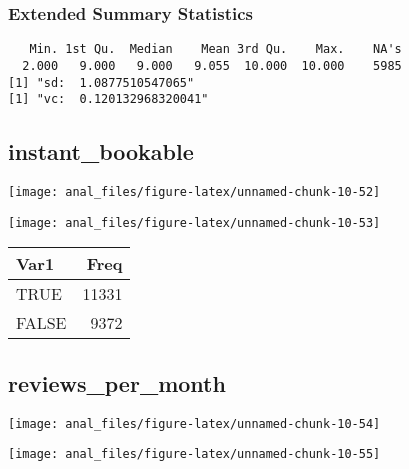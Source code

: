 \hypertarget{extended-summary-statistics-18}{%
\subsubsection{Extended Summary
Statistics}\label{extended-summary-statistics-18}}

\begin{verbatim}   Min. 1st Qu.  Median    Mean 3rd Qu.    Max.    NA's 
  2.000   9.000   9.000   9.055  10.000  10.000    5985 
[1] "sd:  1.0877510547065"
[1] "vc:  0.120132968320041"
\end{verbatim}

\pagebreak

\centering

\hypertarget{instant_bookable}{%
\subsection{instant\_bookable}\label{instant_bookable}}

\begin{center}\texttt{[image: anal\_files/figure-latex/unnamed-chunk-10-52]} \end{center}

\begin{center}\texttt{[image: anal\_files/figure-latex/unnamed-chunk-10-53]} \end{center}

\begin{table}[H]
\centering
\begin{tabular}[t]{lr}
\toprule
Var1 & Freq\\
\midrule
TRUE & 11331\\
FALSE & 9372\\
\bottomrule
\end{tabular}
\end{table}
\pagebreak

\centering

\hypertarget{reviews_per_month}{%
\subsection{reviews\_per\_month}\label{reviews_per_month}}

\begin{center}\texttt{[image: anal\_files/figure-latex/unnamed-chunk-10-54]} \end{center}

\begin{center}\texttt{[image: anal\_files/figure-latex/unnamed-chunk-10-55]} \end{center}

